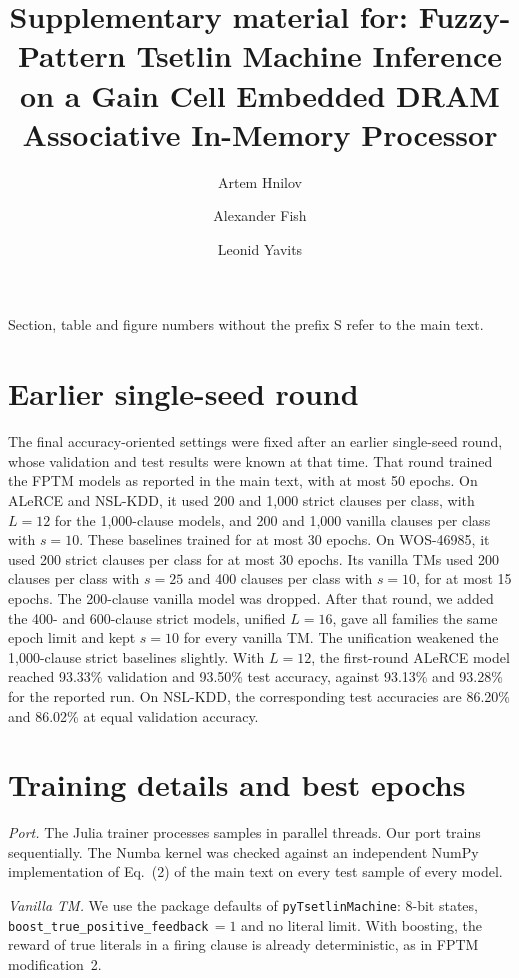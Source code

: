 \documentclass[preprint,12pt]{elsarticle}
\begin{document}
\sloppy
\begin{frontmatter}
\title{Supplementary material for: Fuzzy-Pattern Tsetlin Machine Inference on a Gain Cell Embedded DRAM Associative In-Memory Processor}
\author{Artem Hnilov}
\author{Alexander Fish}
\author{Leonid Yavits}
\end{frontmatter}

Section, table and figure numbers without the prefix S refer to the main text. 

\section{Earlier single-seed round}\label{firstround}
The final accuracy-oriented settings were fixed after an earlier single-seed round, whose validation and test results were known at that time.
That round trained the FPTM models as reported in the main text, with at most 50 epochs.
On ALeRCE and NSL-KDD, it used 200 and 1,000 strict clauses per class, with $L=12$ for the 1,000-clause models, and 200 and 1,000 vanilla clauses per class with $s=10$. These baselines trained for at most 30 epochs.
On WOS-46985, it used 200 strict clauses per class for at most 30 epochs. Its vanilla TMs used 200 clauses per class with $s=25$ and 400 clauses per class with $s=10$, for at most 15 epochs. The 200-clause vanilla model was dropped.
After that round, we added the 400- and 600-clause strict models, unified $L=16$, gave all families the same epoch limit and kept $s=10$ for every vanilla TM.
The unification weakened the 1,000-clause strict baselines slightly. With $L=12$, the first-round ALeRCE model reached 93.33\% validation and 93.50\% test accuracy, against 93.13\% and 93.28\% for the reported run. On NSL-KDD, the corresponding test accuracies are 86.20\% and 86.02\% at equal validation accuracy.

\section{Training details and best epochs}\label{training}
\textit{Port.} The Julia trainer processes samples in parallel threads. Our port trains sequentially.
The Numba kernel was checked against an independent NumPy implementation of Eq.~(2) of the main text on every test sample of every model.

\textit{Vanilla TM.} We use the package defaults of \texttt{pyTsetlinMachine}: 8-bit states, \texttt{boost\_true\_positive\_feedback}$\,=1$ and no literal limit.
With boosting, the reward of true literals in a firing clause is already deterministic, as in FPTM modification~2.
\end{document}
